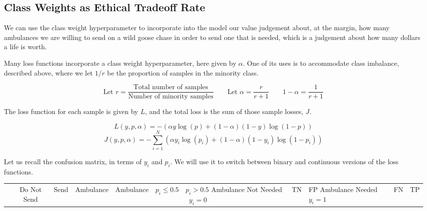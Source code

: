 \subsection{Class Weights as Ethical Tradeoff Rate}

We can use the class weight hyperparameter to incorporate into the model our value judgement about, at the margin, how many ambulances we are willing to send on a wild goose chase in order to send one that is needed, which is a judgement about how many dollars a life is worth.  

Many loss functions incorporate a class weight hyperparameter, here given by $\alpha$.  One of its uses is to accommodate class imbalance, described above, where we let $1/r$ be the proportion of samples in the minority class.

$$\text{Let } r = \frac{ \text{Total number of samples}}{\text{Number of minority samples}} \qquad  \text{Let } \alpha = \frac{r}{r+1} \qquad 1-\alpha = \frac{1}{r+1}$$

The loss function for each sample is given by $L$, and the total loss is the sum of those sample losses, $J$.  

$$L(y,p,\alpha) = - 
	\left( 
		\alpha y \log \left( p \right) + 
		\left( 1-\alpha \right) \left( 1-y \right) \log \left( 1-p \right) 
	\right) 
$$
$$J(y,p,\alpha) = - \sum_{i=1}^N 
	\left( 
		\alpha y_i \log \left( p_i \right) + 
		\left( 1-\alpha \right) \left( 1-y_i \right) \log \left( 1-p_i \right) 
	\right) 
$$

Let us recall the confusion matrix, in terms of $y_i$ and $p_i$.  We will use it to switch between binary and continuous versions of the loss functions.

\begin{center}
\begin{tabular}{r|c|c|c|}
	& Do Not Send & Send \cr
	& Ambulance & Ambulance \cr
	& $p_i \le 0.5$ & $p_i>0.5$  \vrule width 0pt height 0 pt depth 5pt \cr \hline
	Ambulance Not Needed \  $y_i=0$ & TN & FP \vrule width 0pt height 11pt depth 5pt \cr \hline
	Ambulance Needed \   $y_i=1$ & FN & TP \vrule width 0pt height 11pt depth 5pt \cr\hline
\end{tabular}
\end{center}

